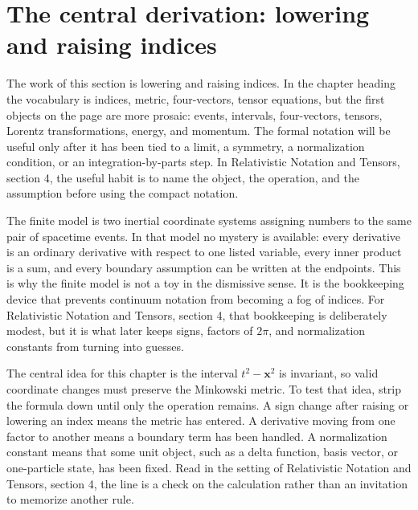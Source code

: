 \section{The central derivation: lowering and raising indices}













The work of this section is lowering and raising indices.  In the chapter heading the vocabulary is indices, metric, four-vectors, tensor equations, but the first objects on the page are more prosaic: events, intervals, four-vectors, tensors, Lorentz transformations, energy, and momentum.  The formal notation will be useful only after it has been tied to a limit, a symmetry, a normalization condition, or an integration-by-parts step.  In Relativistic Notation and Tensors, section 4, the useful habit is to name the object, the operation, and the assumption before using the compact notation.

The finite model is two inertial coordinate systems assigning numbers to the same pair of spacetime events.  In that model no mystery is available: every derivative is an ordinary derivative with respect to one listed variable, every inner product is a sum, and every boundary assumption can be written at the endpoints.  This is why the finite model is not a toy in the dismissive sense.  It is the bookkeeping device that prevents continuum notation from becoming a fog of indices.  For Relativistic Notation and Tensors, section 4, that bookkeeping is deliberately modest, but it is what later keeps signs, factors of \(2\pi\), and normalization constants from turning into guesses.

The central idea for this chapter is the interval \(t^2-\bm x^2\) is invariant, so valid coordinate changes must preserve the Minkowski metric.  To test that idea, strip the formula down until only the operation remains.  A sign change after raising or lowering an index means the metric has entered.  A derivative moving from one factor to another means a boundary term has been handled.  A normalization constant means that some unit object, such as a delta function, basis vector, or one-particle state, has been fixed.  Read in the setting of Relativistic Notation and Tensors, section 4, the line is a check on the calculation rather than an invitation to memorize another rule.

